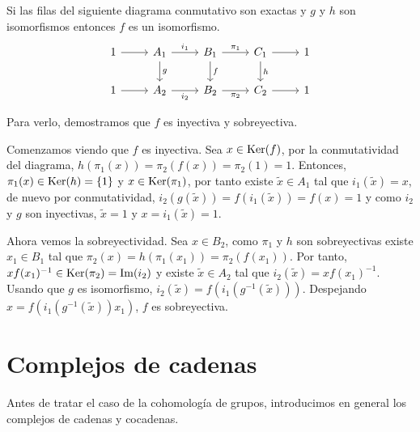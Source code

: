 \begin{proposicion}\label{prop:sflem}
	Si las filas del siguiente diagrama conmutativo son exactas y $g$ y $h$ son isomorfismos entonces $f$ es un isomorfismo.
	\[\begin{tikzcd}
		1 & {A_1} & {B_1} & {C_1} & 1 \\
		1 & {A_2} & {B_2} & {C_2} & 1
		\arrow["g", from=1-2, to=2-2]
		\arrow["{i_1}", from=1-2, to=1-3]
		\arrow["{\pi_1}", from=1-3, to=1-4]
		\arrow["f", from=1-3, to=2-3]
		\arrow["{i_2}"', from=2-2, to=2-3]
		\arrow["{\pi_2}"', from=2-3, to=2-4]
		\arrow["h", from=1-4, to=2-4]
		\arrow[from=1-4, to=1-5]
		\arrow[from=2-1, to=2-2]
		\arrow[from=1-1, to=1-2]
		\arrow[from=2-4, to=2-5]
	\end{tikzcd}\]
	\begin{demostracion}
		Para verlo, demostramos que $f$ es inyectiva y sobreyectiva.
		
		Comenzamos viendo que $f$ es inyectiva. Sea $x\in \operatorname{Ker}(f)$, por la conmutatividad del diagrama, $h(\pi_1(x))=\pi_2(f(x)) = \pi_2(1) = 1$. Entonces, $\pi_1(x)\in \operatorname{Ker}(h) = \{1\}$ y $x\in \operatorname{Ker}(\pi_1)$, por tanto existe $\tilde x\in A_1$ tal que $i_1(\tilde x)=x$, de nuevo por conmutatividad, $i_2(g(\tilde x))=f(i_1(\tilde x))=f(x)=1$ y como $i_2$ y $g$ son inyectivas, $\tilde x = 1$ y $x = i_1(\tilde x)=1$.
		
		Ahora vemos la sobreyectividad. Sea $x\in B_2$, como $\pi_1$ y $h$ son sobreyectivas existe $ x_1\in B_1$ tal que $\pi_2(x)=h(\pi_1(x_1)) = \pi_2(f(x_1))$. Por tanto, $x f(x_1)^{-1} \in \operatorname{Ker}(\pi_2)= \operatorname{Im}(i_2)$ y existe $\tilde x\in A_2$ tal que $i_2(\tilde x)=x f(x_1)^{-1}$. Usando que $g$ es isomorfismo, $i_2(\tilde x) = f(i_1(g^{-1}(\tilde x)))$. Despejando $x = f(i_1(g^{-1}(\tilde x)) x_1)$, $f$ es sobreyectiva.
	\end{demostracion}
\end{proposicion}



\section{Complejos de cadenas}

Antes de tratar el caso de la cohomología de grupos, introducimos en general los complejos de cadenas y cocadenas.
	
